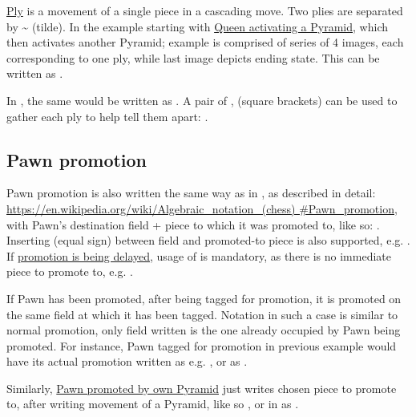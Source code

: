 \hyperref[sec:Terms/Ply]{Ply} is a movement of a single piece in a cascading move. Two plies
are separated by \~{} (tilde). In the example starting with
\hyperref[fig:scn_ma_15_cascading_init]{Queen activating a Pyramid}, which then activates
another Pyramid; example is comprised of series of 4 images, each corresponding to one ply,
while last image depicts ending state. This can be written as .

In , the same would be written as\newline
{}. A pair of \alg{[}, \alg{]} (square brackets) can be used
to gather each ply to help tell them apart:\newline
\alg{[Qk2-f7]\~{}[Af7-i7]\~{}[Ai7-i9]}.

\subsection*{Pawn promotion}
\label{sec:Appendix/Notation/Pawn promotion}

Pawn promotion is also written the same way as in , as described in detail:\newline
\href{https://en.wikipedia.org/wiki/Algebraic\_notation\_(chess)\#Pawn\_promotion}{https://en.wikipedia.org/wiki/Algebraic\_notation\_(chess)\newline
\#Pawn\_promotion}, with Pawn's destination field + piece to which it was promoted to,
like so: . Inserting \alg{=} (equal sign) between field and promoted-to piece
is also supported, e.g. .
If \hyperref[fig:scn_aoa_05_delayed_promo_pawn_2_moved]{promotion is being delayed}, usage
of \alg{=} is mandatory, as there is no immediate piece to promote to, e.g. .

If Pawn has been promoted, after being tagged for promotion, it is promoted on the same
field at which it has been tagged. Notation in such a case is similar to normal promotion,
only field written is the one already occupied by Pawn being promoted. For instance, Pawn
tagged for promotion in previous example would have its actual promotion written as e.g.
, or as .

Similarly, \hyperref[fig:scn_ma_05_promo_init]{Pawn promoted by own Pyramid} just writes
chosen piece to promote to, after writing movement of a Pyramid, like so ,
or in  as \alg{[El4-d8]\~{}[Ad8-h8=Q]}.

